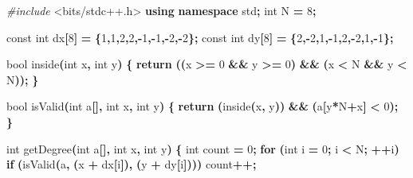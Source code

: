 \documentclass[
]{article}
\newenvironment{Shaded}{\begin{snugshade}}{\end{snugshade}}
\newcommand{\AttributeTok}[1]{\textcolor[rgb]{0.77,0.63,0.00}{#1}}
\newcommand{\ControlFlowTok}[1]{\textcolor[rgb]{0.13,0.29,0.53}{\textbf{#1}}}
\newcommand{\DataTypeTok}[1]{\textcolor[rgb]{0.13,0.29,0.53}{#1}}
\newcommand{\DecValTok}[1]{\textcolor[rgb]{0.00,0.00,0.81}{#1}}
\newcommand{\ImportTok}[1]{#1}
\newcommand{\KeywordTok}[1]{\textcolor[rgb]{0.13,0.29,0.53}{\textbf{#1}}}
\newcommand{\NormalTok}[1]{#1}
\newcommand{\OperatorTok}[1]{\textcolor[rgb]{0.81,0.36,0.00}{\textbf{#1}}}
\newcommand{\PreprocessorTok}[1]{\textcolor[rgb]{0.56,0.35,0.01}{\textit{#1}}}
\begin{document}
\begin{Shaded}
\begin{Highlighting}[]
\PreprocessorTok{\#include }\ImportTok{\textless{}bits/stdc++.h\textgreater{}}
\KeywordTok{using} \KeywordTok{namespace}\NormalTok{ std}\OperatorTok{;}
\DataTypeTok{int}\NormalTok{ N }\OperatorTok{=} \DecValTok{8}\OperatorTok{;}

\AttributeTok{const} \DataTypeTok{int}\NormalTok{ dx}\OperatorTok{[}\DecValTok{8}\OperatorTok{]} \OperatorTok{=} \OperatorTok{\{}\DecValTok{1}\OperatorTok{,}\DecValTok{1}\OperatorTok{,}\DecValTok{2}\OperatorTok{,}\DecValTok{2}\OperatorTok{,{-}}\DecValTok{1}\OperatorTok{,{-}}\DecValTok{1}\OperatorTok{,{-}}\DecValTok{2}\OperatorTok{,{-}}\DecValTok{2}\OperatorTok{\};}
\AttributeTok{const} \DataTypeTok{int}\NormalTok{ dy}\OperatorTok{[}\DecValTok{8}\OperatorTok{]} \OperatorTok{=} \OperatorTok{\{}\DecValTok{2}\OperatorTok{,{-}}\DecValTok{2}\OperatorTok{,}\DecValTok{1}\OperatorTok{,{-}}\DecValTok{1}\OperatorTok{,}\DecValTok{2}\OperatorTok{,{-}}\DecValTok{2}\OperatorTok{,}\DecValTok{1}\OperatorTok{,{-}}\DecValTok{1}\OperatorTok{\};}

\DataTypeTok{bool}\NormalTok{ inside}\OperatorTok{(}\DataTypeTok{int}\NormalTok{ x}\OperatorTok{,} \DataTypeTok{int}\NormalTok{ y}\OperatorTok{)}
\OperatorTok{\{}
    \ControlFlowTok{return} \OperatorTok{((}\NormalTok{x }\OperatorTok{\textgreater{}=} \DecValTok{0} \OperatorTok{\&\&}\NormalTok{ y }\OperatorTok{\textgreater{}=} \DecValTok{0}\OperatorTok{)} \OperatorTok{\&\&} \OperatorTok{(}\NormalTok{x }\OperatorTok{\textless{}}\NormalTok{ N }\OperatorTok{\&\&}\NormalTok{ y }\OperatorTok{\textless{}}\NormalTok{ N}\OperatorTok{));}
\OperatorTok{\}}

\DataTypeTok{bool}\NormalTok{ isValid}\OperatorTok{(}\DataTypeTok{int}\NormalTok{ a}\OperatorTok{[],} \DataTypeTok{int}\NormalTok{ x}\OperatorTok{,} \DataTypeTok{int}\NormalTok{ y}\OperatorTok{)}
\OperatorTok{\{}
    \ControlFlowTok{return} \OperatorTok{(}\NormalTok{inside}\OperatorTok{(}\NormalTok{x}\OperatorTok{,}\NormalTok{ y}\OperatorTok{))} \OperatorTok{\&\&} \OperatorTok{(}\NormalTok{a}\OperatorTok{[}\NormalTok{y}\OperatorTok{*}\NormalTok{N}\OperatorTok{+}\NormalTok{x}\OperatorTok{]} \OperatorTok{\textless{}} \DecValTok{0}\OperatorTok{);}
\OperatorTok{\}}

\DataTypeTok{int}\NormalTok{ getDegree}\OperatorTok{(}\DataTypeTok{int}\NormalTok{ a}\OperatorTok{[],} \DataTypeTok{int}\NormalTok{ x}\OperatorTok{,} \DataTypeTok{int}\NormalTok{ y}\OperatorTok{)}
\OperatorTok{\{}
    \DataTypeTok{int}\NormalTok{ count }\OperatorTok{=} \DecValTok{0}\OperatorTok{;}
    \ControlFlowTok{for} \OperatorTok{(}\DataTypeTok{int}\NormalTok{ i }\OperatorTok{=} \DecValTok{0}\OperatorTok{;}\NormalTok{ i }\OperatorTok{\textless{}}\NormalTok{ N}\OperatorTok{;} \OperatorTok{++}\NormalTok{i}\OperatorTok{)}
        \ControlFlowTok{if} \OperatorTok{(}\NormalTok{isValid}\OperatorTok{(}\NormalTok{a}\OperatorTok{,} \OperatorTok{(}\NormalTok{x }\OperatorTok{+}\NormalTok{ dx}\OperatorTok{[}\NormalTok{i}\OperatorTok{]),} \OperatorTok{(}\NormalTok{y }\OperatorTok{+}\NormalTok{ dy}\OperatorTok{[}\NormalTok{i}\OperatorTok{])))}
\NormalTok{            count}\OperatorTok{++;}


\end{Highlighting}
\end{Shaded}
\end{document}
